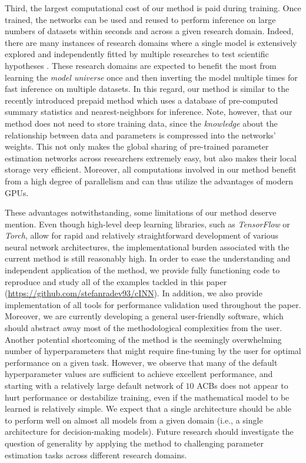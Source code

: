 \documentclass[9pt,twoside,lineno]{pnas-new}
\begin{document}
Third, the largest computational cost of our method is paid during training. Once trained, the networks can be used and reused to perform inference on large numbers of datasets within seconds and across a given research domain. Indeed, there are many instances of research domains where a single model is extensively explored and independently fitted by multiple researches to test scientific hypotheses \cite{voss2019sequential, zappia2017splatter, ratcliff2008diffusion, de2002fitting}. These research domains are expected to benefit the most from learning the \textit{model universe} once and then inverting the model multiple times for fast inference on multiple datasets. In this regard, our method is similar to the recently introduced prepaid method \cite{mestdagh2018prepaid} which uses a database of pre-computed summary statistics and nearest-neighbors for inference. Note, however, that our method does not need to store training data, since the \textit{knowledge} about the relationship between data and parameters is compressed into the networks' weights. This not only makes the global sharing of pre-trained parameter estimation networks across researchers extremely easy, but also makes their local storage very efficient. Moreover, all computations involved in our method benefit from a high degree of parallelism and can thus utilize the advantages of modern GPUs.

These advantages notwithstanding, some limitations of our method deserve mention. Even though high-level deep learning libraries, such as \textit{TensorFlow} or \textit{Torch}, allow for rapid and relatively straightforward development of various neural network architectures, the implementational burden associated with the current method is still reasonably high. In order to ease the understanding and independent application of the method, we provide fully functioning code to reproduce and study all of the examples tackled in this paper (\href{https://github.com/stefanradev93/cINN}{https://github.com/stefanradev93/cINN}). In addition, we also provide implementation of all tools for performance validation used throughout the paper. Moreover, we are currently developing a general user-friendly software, which should abstract away most of the methodological complexities from the user. Another potential shortcoming of the method is the seemingly overwhelming number of hyperparameters that might require fine-tuning by the user for optimal performance on a given task. However, we observe that many of the default hyperparameter values are sufficient to achieve excellent performance, and starting with a relatively large default network of $10$ ACBs does not appear to hurt performance or destabilize training, even if the mathematical model to be learned is relatively simple. We expect that a single architecture should be able to perform well on almost all models from a given domain (i.e., a single architecture for decision-making models). Future research should investigate the question of generality by applying the method to challenging parameter estimation tasks across different research domains.
\end{document}

